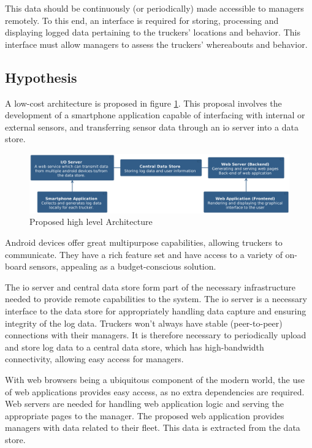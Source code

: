 This data should be continuously (or periodically) made accessible to managers remotely.
To this end, an interface is required for storing, processing and displaying logged data pertaining to the truckers' locations and behavior.
This interface must allow managers to assess the truckers' whereabouts and behavior.

\pagebreak
\subsection{Hypothesis}
A low-cost architecture is proposed in figure \ref{fig:hypothesis}.
This proposal involves the development of a smartphone application capable of interfacing with internal or external sensors, and transferring sensor data through an \ac{io} server into a data store. \cite{bertocco1998client}

\begin{figure}[H]
    \centering
    \includegraphics[width=6in]{../diag/hypothesis.png}
    \caption{Proposed high level Architecture}
    \label{fig:hypothesis}
\end{figure}

Android devices offer great multipurpose capabilities, allowing truckers to communicate.
They have a rich feature set and have access to a variety of on-board sensors, appealing as a budget-conscious solution.

The \ac{io} server and central data store form part of the necessary infrastructure needed to provide remote capabilities to the system.
The \ac{io} server is a necessary interface to the data store for appropriately handling data capture and ensuring integrity of the log data.
Truckers won't always have stable (peer-to-peer) connections with their managers.
It is therefore necessary to periodically upload and store log data to a central data store, which has high-bandwidth connectivity, allowing easy access for managers.

With web browsers being a ubiquitous component of the modern world, the use of web applications provides easy access, as no extra dependencies are required.
Web servers are needed for handling web application logic and serving the appropriate pages to the manager.
The proposed web application provides managers with data related to their fleet.
This data is extracted from the data store.

